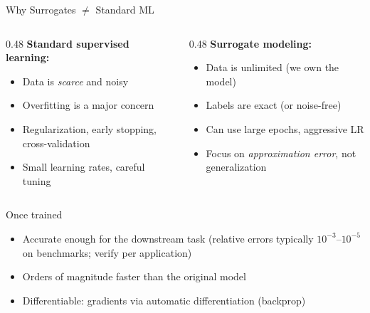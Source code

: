 \documentclass[aspectratio=169,11pt]{beamer}
\newcommand{\emphc}[1]{\textcolor{harvardcrimson}{#1}}
\begin{document}
\begin{frame}[shrink=4]{Why Surrogates $\neq$ Standard ML}
\begin{columns}[T]
\begin{column}{0.48\textwidth}
\textbf{Standard supervised learning:}
\begin{itemize}
  \item Data is \emph{scarce} and noisy
  \item Overfitting is a major concern
  \item Regularization, early stopping, cross-validation
  \item Small learning rates, careful tuning
\end{itemize}
\end{column}
\begin{column}{0.48\textwidth}
\textbf{Surrogate modeling:}
\begin{itemize}
  \item Data is \emphc{unlimited} (we own the model)
  \item Labels are \emphc{exact} (or noise-free)
  \item Can use large epochs, aggressive LR
  \item Focus on \emph{approximation error}, not generalization
\end{itemize}
\end{column}
\end{columns}

\vspace{0.5cm}
\begin{block}{Once trained}
\begin{itemize}
  \item \emphc{Accurate enough for the downstream task} (relative errors typically $10^{-3}$--$10^{-5}$ on benchmarks; verify per application)
  \item \emphc{Orders of magnitude faster} than the original model
  \item \emphc{Differentiable:} gradients via automatic differentiation (backprop)
\end{itemize}
\end{block}
\end{frame}
\end{document}
